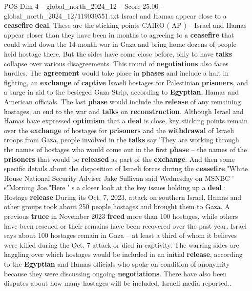 \begin{textsample}{POS Dim 4 – global\_north\_2024\_12 – Score 25.00 – global\_north\_2024\_12/119039551.txt}  \label{ex:f4_pos_325}
Israel and Hamas appear close to a \textbf{ceasefire} \textbf{deal}.
These are the sticking points CAIRO ( AP ) -- Israel and Hamas appear closer than they have been in months to agreeing to a \textbf{ceasefire} that could wind down the 14-month war in Gaza and bring home dozens of people held hostage there.
But the sides have come close before, only to have \textbf{talks} collapse over various disagreements.
This round of \textbf{negotiations} also faces hurdles.
The \textbf{agreement} would take place in \textbf{phases} and include a halt in fighting, an \textbf{exchange} of \textbf{captive} Israeli hostages for Palestinian \textbf{prisoners}, and a surge in aid to the besieged Gaza Strip, according to \textbf{Egyptian}, Hamas and American officials.
The last \textbf{phase} would include the \textbf{release} of any remaining hostages, an end to the war and \textbf{talks} on \textbf{reconstruction}.
Although Israel and Hamas have expressed \textbf{optimism} that a \textbf{deal} is close, key sticking points remain over the \textbf{exchange} of hostages for \textbf{prisoners} and the \textbf{withdrawal} of Israeli troops from Gaza, people involved in the \textbf{talks} say."They are working through the names of hostages who would come out in the first \textbf{phase} -- the names of the \textbf{prisoners} that would be \textbf{released} as part of the \textbf{exchange}.
And then some specific details about the disposition of Israeli forces during the \textbf{ceasefire},"White House National Security Adviser Jake Sullivan said Wednesday on MSNBC ' s"Morning Joe."Here ' s a closer look at the key issues holding up a \textbf{deal} : Hostage \textbf{release} During its Oct. 7, 2023, attack on southern Israel, Hamas and other groups took about 250 people hostages and brought them to Gaza.
A previous \textbf{truce} in November 2023 \textbf{freed} more than 100 hostages, while others have been rescued or their remains have been recovered over the past year.
Israel says about 100 hostages remain in Gaza -- at least a third of whom it believes were killed during the Oct. 7 attack or died in captivity.
The warring sides are haggling over which hostages would be included in an initial \textbf{release}, according to the \textbf{Egyptian} and Hamas officials who spoke on condition of anonymity because they were discussing ongoing \textbf{negotiations}.
There have also been disputes about how many hostages will be included, Israeli media reported..

\end{textsample}
